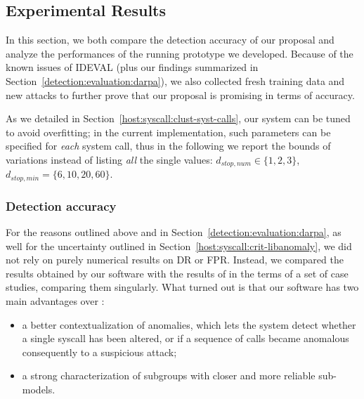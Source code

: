 \subsection{Experimental Results}
\label{host:syscall:result-analysis}
In this section, we both compare the detection accuracy of our
proposal and analyze the performances of the running prototype we
developed. Because of the known issues of \ac{IDEVAL}
(plus our findings summarized in
Section~\ref{detection:evaluation:darpa}), we also collected fresh
training data and new attacks to further prove that our proposal is
promising in terms of accuracy.

As we detailed in Section~\ref{host:syscall:clust-syst-calls}, our
system can be tuned to avoid overfitting; in the current
implementation, such parameters can be specified for \emph{each}
system call, thus in the following we report the bounds of variations
instead of listing \emph{all} the single values: $d_{stop,num} \in
\{1,2,3\}$, $d_{stop,min} = \{6,10,20,60\}$.

\subsubsection{Detection accuracy}
\label{host:syscall:detection-accuracy}
For the reasons outlined above and in
Section~\ref{detection:evaluation:darpa}, as well for the uncertainty
outlined in Section~\ref{host:syscall:crit-libanomaly}, we did not
rely on purely numerical results on \ac{DR} or \ac{FPR}. Instead, we
compared the results obtained by our software with the results of
\SyscallAnomaly in the terms of a set of case studies, comparing them
singularly. What turned out is that our software has two main
advantages over \LibAnomaly:

\begin{itemize}
\item a better contextualization of anomalies, which lets the system
  detect whether a single syscall has been altered, or if a sequence
  of calls became anomalous consequently to a suspicious attack;
\item a strong characterization of subgroups with closer and more
  reliable sub-models.
\end{itemize}

